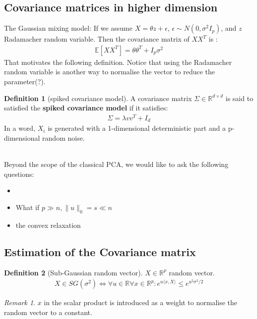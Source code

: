 \documentclass[a4paper,12pt, oneside, fleqn]{book}
\theoremstyle{definition}
\newtheorem{definition}{Definition}[section]
\theoremstyle{remark}
\newtheorem*{remark}{Remark}
\begin{document}
\subsection{Covariance matrices in higher dimension}
The Gaussian mixing model:
If we assume  $X = \theta z + \epsilon$, $\epsilon \sim N(0, \sigma^2 I_p)$, and $z$ Radamacher random variable. Then the covariance matrix of $XX^T$ is :
\begin{align*}
	\mathbb{E}[XX^T] = \theta \theta^T + I_p \sigma^2
\end{align*}
That motivates the following definition. Notice that using the Radamacher random variable is another way to normalise the vector to reduce the parameter(?).
\begin{definition}[spiked covariance model]
	A covariance matrix $\Sigma \in \mathbb{R}^{d \times d}$ is said to satisfied the \textbf{spiked covariance model} if it satisfies:
	\begin{align*}
		\Sigma = \lambda v v^T + I_d
	\end{align*}
	In a word, $X_i$ is generated with a 1-dimensional deterministic part and a p-dimensional random noise.
\end{definition}
\quad\\
Beyond the scope of the classical PCA, we would like to ask the following questions:
\begin{itemize}
	\item 
	\item What if $p \gg n, \|u\|_0 = s \ll n$
	\item the convex relaxation
\end{itemize}


\subsection{Estimation of the Covariance matrix}
\begin{definition}[Sub-Gaussian random vector]
$X\in \mathbb{R}^p$ random vector.
\begin{align*}
	X \in SG(\sigma^2) \Leftrightarrow \forall u \in \mathbb{R} \forall x \in \mathbb{R}^p:  e^{u\langle x, X \rangle} \leq e^{u^2 \sigma^2 \slash 2}
\end{align*}
\end{definition}
\begin{remark}
$x$ in the scalar product is introduced as a weight to normalise the random vector to a constant.	
\end{remark}
\end{document}
